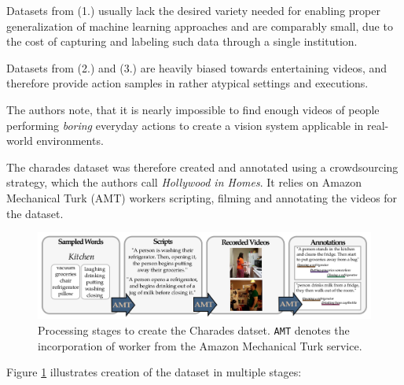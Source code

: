 Datasets from (1.) usually lack the desired variety needed for enabling proper generalization of machine learning approaches and are comparably small, due to the cost of capturing and labeling such data through a single institution.

Datasets from (2.) and (3.) are heavily biased towards entertaining videos, and therefore provide action samples in rather atypical settings and executions.

The authors note, that it is nearly impossible to find enough videos of people performing \textit{boring} everyday actions to create a vision system applicable in real-world environments.

The charades dataset was therefore created and annotated using a crowdsourcing strategy, which the authors call \textit{Hollywood in Homes}.
It relies on Amazon Mechanical Turk (AMT) workers scripting, filming and annotating the videos for the dataset.

\begin{figure}[H]
    \centering
    \includegraphics[width=\textwidth]{img_datasets/charades_amt_creation}
    \caption{Processing stages to create the Charades datset. \texttt{AMT} denotes the incorporation of worker from the Amazon Mechanical Turk service. \cite{sigurdsson_hollywood_2016}} 
    \label{fig:charades_amt_creation}
\end{figure}

Figure \ref{fig:charades_amt_creation} illustrates creation of the dataset in multiple stages:

